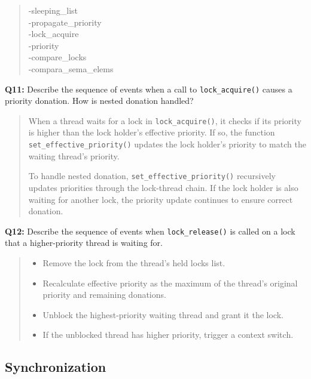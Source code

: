 \documentclass[a4paper,11pt]{paper}
\begin{document}
\begin{quote}
  -sleeping_list\\
  -propagate_priority\\
  -lock_acquire\\
  -priority\\
  -compare_locks\\
  -compara_sema_elems\\
  
\end{quote}

\textbf{Q11:} Describe the sequence of events when a call to
\texttt{lock\_acquire()} causes a priority donation.  How is nested donation
handled?

\begin{quote}
  When a thread waits for a lock in \texttt{lock\_acquire()}, it checks if its priority is higher than the lock holder’s effective priority.  
If so, the function \texttt{set\_effective\_priority()} updates the lock holder’s priority to match the waiting thread’s priority.

To handle nested donation, \texttt{set\_effective\_priority()} recursively updates priorities through the lock-thread chain.  
If the lock holder is also waiting for another lock, the priority update continues to ensure correct donation.
\end{quote}

\textbf{Q12:} Describe the sequence of events when \texttt{lock\_release()} is
called on a lock that a higher-priority thread is waiting for.

\begin{quote}
 \begin{itemize}
    \item Remove the lock from the thread’s held locks list.
    \item Recalculate effective priority as the maximum of the thread’s original priority and remaining donations.
    \item Unblock the highest-priority waiting thread and grant it the lock.
    \item If the unblocked thread has higher priority, trigger a context switch.
\end{itemize}
\end{quote}

\subsection{Synchronization}
 
\end{document}
